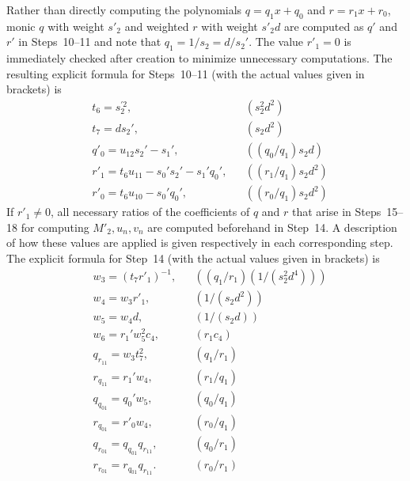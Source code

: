 Rather than directly computing the polynomials $q = q_1x + q_0$ and $r = r_1x +
r_0$, monic $q$ with weight $s'_2$ and weighted $r$ with weight $s'_2d$ are
computed as $q'$ and $r'$ in Steps~10--11 and note that $q_1 = 1/s_2 = d/s_2'$. The value
$r'_1=0$ is immediately checked after creation to minimize unnecessary
computations.  The resulting explicit formula for Steps~10--11 (with the actual
values given in brackets) is
\begin{align*} 
    & t_6 = s_2^{\prime 2},                                   && (s_2^2d^2) \\
    & t_7 = ds_2',                                            && (s_2d^2) \\ 
    & q'_0 = u_{12}s_2' - s_1',                                && ((q_0/q_1)s_2d) \\
    & r'_1 = t_6u_{11} - s_0's_2' - s_1'q_0',                   && ((r_1/q_1)s_2d^2)\\
    & r'_0 = t_6u_{10} - s_0'q_0',              && ((r_0/q_1)  s_2  d^2)
\end{align*}
If $r'_1 \neq 0$, all necessary ratios of the coefficients of $q$ and $r$ that
arise in Steps~15--18 for computing $M'_2,u_n,v_n$ are computed beforehand in
Step~14. A description of how these values are applied is given respectively in
each corresponding step. The explicit formula for Step~14 (with the actual
values given in brackets) is
\begin{align*}
   & w_3 = (t_7r'_1)^{-1},                    && ((q_1/r_1)  (1/(s_2^2  d^4)))\\
   & w_4 = w_3r'_1,                           && (1/(s_2  d^2)) \\ 
   & w_5 = w_4d,                             && (1/(s_2  d)) \\
   & w_6 = r_1'w_5^2c_4,                      && (r_1  c_4) \\
   & q_{r_{11}} = w_3t_7^2,                  && (q_1/r_1) \\
   & r_{q_{11}} = r_1'w_4,                    && (r_1/q_1) \\
   & q_{q_{01}} = q_0'w_5,                    && (q_0/q_1) \\
   & r_{q_{01}} = r'_0w_4,                    && (r_0/q_1) \\
   & q_{r_{01}} = q_{q_{01}}q_{r_{11}},      && (q_0/r_1) \\
   & r_{r_{01}} = r_{q_{01}}q_{r_{11}}.      && (r_0/r_1)
\end{align*}

